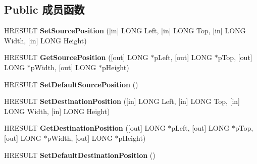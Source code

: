 \subsection*{Public 成员函数}
\begin{DoxyCompactItemize}
\item 
\mbox{\label{interface_quartz_type_lib_1_1_i_basic_video_a23336d317a55dedf2c1668e95b4397ab}} 
H\+R\+E\+S\+U\+LT {\bfseries Set\+Source\+Position} (\mbox{[}in\mbox{]} L\+O\+NG Left, \mbox{[}in\mbox{]} L\+O\+NG Top, \mbox{[}in\mbox{]} L\+O\+NG Width, \mbox{[}in\mbox{]} L\+O\+NG Height)
\item 
\mbox{\label{interface_quartz_type_lib_1_1_i_basic_video_a0db87969d374d4d066d31eb1cf073102}} 
H\+R\+E\+S\+U\+LT {\bfseries Get\+Source\+Position} (\mbox{[}out\mbox{]} L\+O\+NG $\ast$p\+Left, \mbox{[}out\mbox{]} L\+O\+NG $\ast$p\+Top, \mbox{[}out\mbox{]} L\+O\+NG $\ast$p\+Width, \mbox{[}out\mbox{]} L\+O\+NG $\ast$p\+Height)
\item 
\mbox{\label{interface_quartz_type_lib_1_1_i_basic_video_abf8e47f0db5127ba6ceea6eaa2891ed3}} 
H\+R\+E\+S\+U\+LT {\bfseries Set\+Default\+Source\+Position} ()
\item 
\mbox{\label{interface_quartz_type_lib_1_1_i_basic_video_aec333b38d28259e3345ac0af745b8129}} 
H\+R\+E\+S\+U\+LT {\bfseries Set\+Destination\+Position} (\mbox{[}in\mbox{]} L\+O\+NG Left, \mbox{[}in\mbox{]} L\+O\+NG Top, \mbox{[}in\mbox{]} L\+O\+NG Width, \mbox{[}in\mbox{]} L\+O\+NG Height)
\item 
\mbox{\label{interface_quartz_type_lib_1_1_i_basic_video_a4c546cfee071604338649ee0cfd67f0e}} 
H\+R\+E\+S\+U\+LT {\bfseries Get\+Destination\+Position} (\mbox{[}out\mbox{]} L\+O\+NG $\ast$p\+Left, \mbox{[}out\mbox{]} L\+O\+NG $\ast$p\+Top, \mbox{[}out\mbox{]} L\+O\+NG $\ast$p\+Width, \mbox{[}out\mbox{]} L\+O\+NG $\ast$p\+Height)
\item 
\mbox{\label{interface_quartz_type_lib_1_1_i_basic_video_adfb51aebb7ec4afd96e88971590d3685}} 
H\+R\+E\+S\+U\+LT {\bfseries Set\+Default\+Destination\+Position} ()

\end{DoxyCompactItemize}
